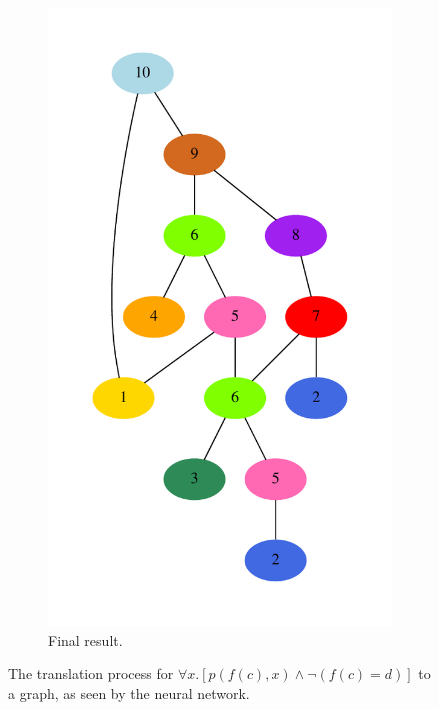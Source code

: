 \documentclass{llncs}
\begin{document}
\begin{figure}[t]
\begin{subfigure}{.25\textwidth}
		\includegraphics[width=\linewidth]{translation-undirected}
		\caption{Final result.}
	\end{subfigure}
	\caption{The translation process for \(\forall x. \left[p\left(f(c), x\right) \wedge \lnot\left(f(c) = d\right)\right]\) to a graph, as seen by the neural network.}
	\label{figure:translation}
\end{figure}
\end{document}

